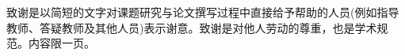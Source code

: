 \documentclass[type = doctor,class = academic]{whu-thesis}
\begin{document}
\tableofcontents %


\mainmatter


% 
% 
% 
% 
% 
% 


\printbibliography

\begin{acknowledgements}
  致谢是以简短的文字对课题研究与论文撰写过程中直接给予帮助的人员(例如指导教师、答疑教师及其他人员)表示谢意。致谢是对他人劳动的尊重，也是学术规范。内容限一页。
\end{acknowledgements}


% 
\end{document}
